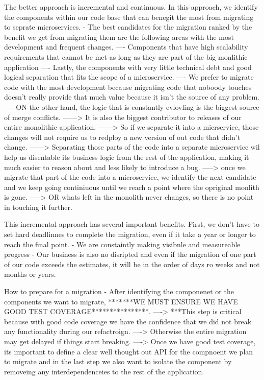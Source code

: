 \documentclass[a4paper, 11pt]{book}
\begin{document}
    The better approach is incremental and continuous.
    In this approach, we identify the components within our code base that can benegit the most from migrating to seprate microservices.
    - The best candidates for the migration ranked by the benefit we get from migrating them are the following areas with the most development and frequent changes.
    ---- Components that have high scalability requirements that cannot be met as long as they are part of the big monlithic application
    ---- Lastly, the components with very little technical debt and good logical separation that fits the scope of a microservice.
    ---- We prefer to migrate code with the most development because migrating code that noboody touches doesn't really provide that much value because it isn't the source of any problem.
    ---- ON the other hand, the logic that is constantly evlovling is the biggest source of merge conflicts.
    ------> It is also the biggest contributor to releases of our entire monolithic application.
    ------> So if we separate it into a micrservice, those changes will not require us to redploy a new version of out code that didn't change.
    ------> Separating those parts of the code into a separate microservice wil help us disentable its business logic from the rest of the application, making it much easier to reason about and less likely to introduce a bug.
    -----> once we migrate that part of the code into a microservice, we identify the next candidate and we keep going continiuous until we reach a point where the opriginal monlith is gone.
    -----> OR whats left in the monolith never changes, so there is no point in touching it further.

    This incremental approach has several important benefits.
    First, we don't have to set hard deadlinnes to complete the migration, even if it take a year or longer to reach the final point.
    - We are constaintly making visibnle and measureable progress
    - Our business is also no disripted and even if the migration of one part of our code exceeds the estimates, it will be in the order of days ro weeks and not months or years.

    How to prepare for a migration
    - After identifying the componenet or the components we want to migrate, *******WE MUST ENSURE WE HAVE GOOD TEST COVERAGE****************.
    ----> ***This step is critical because with good code coverage we have the confidence that we did not break any functionality during our refactroign.
    ----> Otherwise the entire migration may get delayed if things start breaking.
    ----> Once we have good test coverage, its important to define a clear well thought out API for the compnoent we plan to migrate and in the last step we also want to isolate the component by removeing any interdependenceies to the rest of the application.
\end{document}
